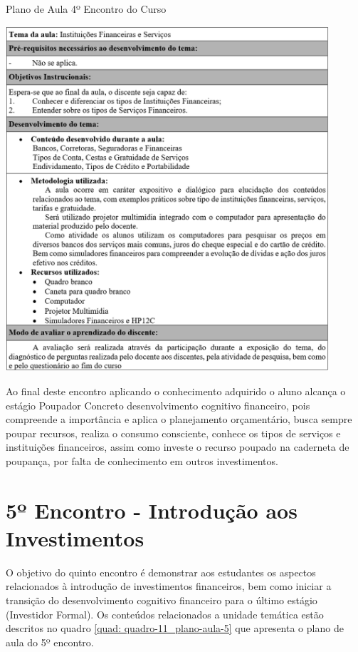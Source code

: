 \newpage
\graphicspath{{quadros/}} 
\begin{quadro}[!ht]
\centering
\begin{minipage}{1.\textwidth}
\caption{Plano de Aula 4º Encontro do Curso}
\centering
\includegraphics[width=0.9\textwidth]{quadro-10_plano-aula-4}
\label{quad: quadro-10_plano-aula-4}
\end{minipage}
\end{quadro}

Ao final deste encontro aplicando o conhecimento adquirido o aluno alcança o estágio Poupador Concreto desenvolvimento cognitivo financeiro, pois compreende a importância e aplica o planejamento orçamentário, busca sempre poupar recursos, realiza o consumo consciente, conhece os tipos de serviços e instituições financeiros, assim como investe o recurso poupado na caderneta de poupança, por falta de conhecimento em outros investimentos.

\section{5º Encontro - Introdução aos Investimentos}
O objetivo do quinto encontro é demonstrar aos estudantes os aspectos relacionados à introdução de investimentos financeiros, bem como iniciar a transição do desenvolvimento cognitivo financeiro para o último estágio (Investidor Formal). Os conteúdos relacionados a unidade temática estão descritos no quadro \ref{quad: quadro-11_plano-aula-5} que apresenta o plano de aula do 5º encontro.

